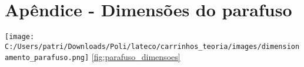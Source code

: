 \section*{Apêndice - Dimensões do parafuso}

	\begin{center}
\texttt{[image: C:/Users/patri/Downloads/Poli/lateco/carrinhos\_teoria/images/dimensionamento\_parafuso.png]}
	\ref{fig:parafuso_dimensoes}
	\end{center} 